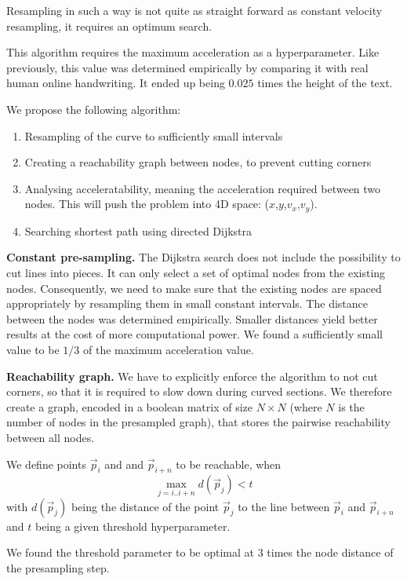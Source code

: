 Resampling in such a way is not quite as straight forward as constant velocity resampling, it requires an optimum search.

This algorithm requires the maximum acceleration as a hyperparameter. Like previously, this value was determined empirically by comparing it with real human online handwriting. It ended up being $0.025$ times the height of the text.

We propose the following algorithm:
\begin{enumerate}[topsep=0pt,itemsep=-1ex,partopsep=1ex,parsep=1ex]
\item Resampling of the curve to sufficiently small intervals
\item Creating a reachability graph between nodes, to prevent cutting corners
\item Analysing acceleratability, meaning the acceleration required between two nodes. This will push the problem into 4D space: ($x$,$y$,$v_x$,$v_y$).
\item Searching shortest path using directed Dijkstra
\end{enumerate}

\textbf{Constant pre-sampling.} The Dijkstra search does not include the possibility to cut lines into pieces. It can only select a set of optimal nodes from the existing nodes. Consequently, we need to make sure that the existing nodes are spaced appropriately by resampling them in small constant intervals. The distance between the nodes was determined empirically. Smaller distances yield better results at the cost of more computational power. We found a sufficiently small value to be $1/3$ of the maximum acceleration value.

\textbf{Reachability graph.} We have to explicitly enforce the algorithm to not cut corners, so that it is required to slow down during curved sections.
We therefore create a graph, encoded in a boolean matrix of size $N\times N$ (where $N$ is the number of nodes in the presampled graph), that stores the pairwise reachability between all nodes.

We define points $\vec{p}_i$ and and $\vec{p}_{i+n}$ to be reachable, when
\begin{equation}
\max_{j=i..i+n} d(\vec{p}_j) < t
\end{equation}
with $d(\vec{p}_j)$ being the distance of the point $\vec{p}_j$ to the line between $\vec{p}_i$ and $\vec{p}_{i+n}$ and $t$ being a given threshold hyperparameter.
 
We found the threshold parameter to be optimal at $3$ times the node distance of the presampling step.


